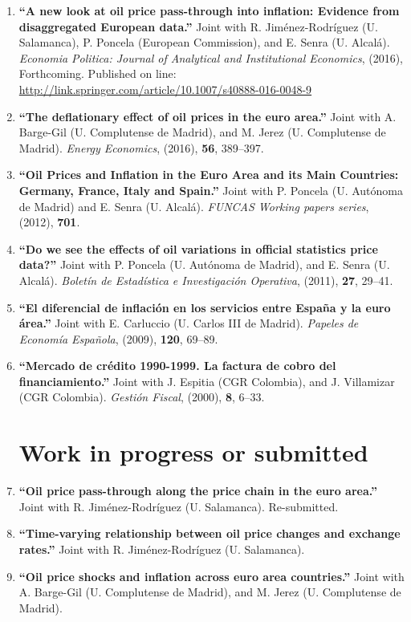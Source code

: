 \documentclass[11pt]{article}\usepackage[]{graphicx}\usepackage[]{color}
\begin{document}
\begin{enumerate}
\item \textbf{``A new look at oil price pass-through into inflation: Evidence from disaggregated European data.''} Joint with R. Jiménez-Rodríguez (U. Salamanca), P. Poncela (European Commission), and E. Senra (U. Alcalá). \emph{Economia Politica: Journal of Analytical and Institutional Economics}, (2016), Forthcoming. Published on line: \href{http://link.springer.com/article/10.1007/s40888-016-0048-9}{http://link.springer.com/article/10.1007/s40888-016-0048-9}

\item \textbf{``The deflationary effect of oil prices in the euro area.''} Joint with A. Barge-Gil (U. Complutense de Madrid), and M. Jerez (U. Complutense de Madrid). \emph{Energy Economics}, (2016), \textbf{56}, 389--397.

\item \textbf{``Oil Prices and Inflation in the Euro Area and its Main Countries: Germany, France, Italy and Spain.''} Joint with P. Poncela (U. Autónoma de Madrid) and E. Senra (U. Alcalá). \emph{FUNCAS Working papers series}, (2012), \textbf{701}.

\item \textbf{``Do we see the effects of oil variations in official statistics price data?''} Joint with P. Poncela (U. Autónoma de Madrid), and E. Senra (U. Alcalá). \emph{Boletín de Estadística e Investigación Operativa}, (2011), \textbf{27}, 29--41.

\item \textbf{``El diferencial de inflación en los servicios entre España y la euro área.''} Joint with E. Carluccio (U. Carlos III de Madrid). \emph{Papeles de Economía Española}, (2009), \textbf{120}, 69--89.

\item \textbf{``Mercado de crédito 1990-1999. La factura de cobro del financiamiento.''} Joint with J. Espitia (CGR Colombia), and J. Villamizar (CGR Colombia). \emph{Gestión Fiscal}, (2000), \textbf{8}, 6--33.
\\

\noindent
\section{Work in progress or submitted}

\item \textbf{``Oil price pass-through along the price chain in the euro area.''} Joint with R. Jiménez-Rodríguez (U. Salamanca). Re-submitted.

\item \textbf{``Time-varying relationship between oil price changes and exchange rates.''} Joint with R. Jiménez-Rodríguez (U. Salamanca).

\item \textbf{``Oil price shocks and inflation across euro area countries.''} Joint with A. Barge-Gil (U. Complutense de Madrid), and M. Jerez (U. Complutense de Madrid).
\\
\end{enumerate}
\end{document}
